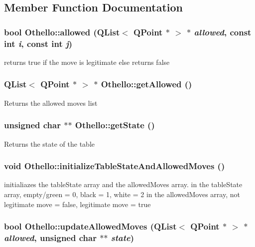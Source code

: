\subsection{Member Function Documentation}
\hypertarget{classOthello_a8c09fac5f811de871610e29584f39223}{
\subsubsection[{allowed}]{\setlength{\rightskip}{0pt plus 5cm}bool Othello::allowed (QList$<$ QPoint $\ast$ $>$ $\ast$ {\em allowed}, \/  const int {\em i}, \/  const int {\em j})}}
\label{classOthello_a8c09fac5f811de871610e29584f39223}
returns true if the move is legitimate else returns false \hypertarget{classOthello_a04ed8a5292e35c7f1d270043fd2f6b23}{
\subsubsection[{getAllowed}]{\setlength{\rightskip}{0pt plus 5cm}QList$<$ QPoint $\ast$ $>$ $\ast$ Othello::getAllowed ()}}
\label{classOthello_a04ed8a5292e35c7f1d270043fd2f6b23}
Returns the allowed moves list \hypertarget{classOthello_aca9c2604072c6f0b49397a1e755237c6}{
\subsubsection[{getState}]{\setlength{\rightskip}{0pt plus 5cm}unsigned char $\ast$$\ast$ Othello::getState ()}}
\label{classOthello_aca9c2604072c6f0b49397a1e755237c6}
Returns the state of the table \hypertarget{classOthello_a1a62eecf0fdeb78c42ff01b4c2029b36}{
\subsubsection[{initializeTableStateAndAllowedMoves}]{\setlength{\rightskip}{0pt plus 5cm}void Othello::initializeTableStateAndAllowedMoves ()}}
\label{classOthello_a1a62eecf0fdeb78c42ff01b4c2029b36}
initialiazes the tableState array and the allowedMoves array. in the tableState array, empty/green = 0, black = 1, white = 2 in the allowedMoves array, not legitimate move = false, legitimate move = true \hypertarget{classOthello_a218e0649bae4dd80ed1619d01fc34e47}{
\subsubsection[{updateAllowedMoves}]{\setlength{\rightskip}{0pt plus 5cm}bool Othello::updateAllowedMoves (QList$<$ QPoint $\ast$ $>$ $\ast$ {\em allowed}, \/  unsigned char $\ast$$\ast$ {\em state})}}
